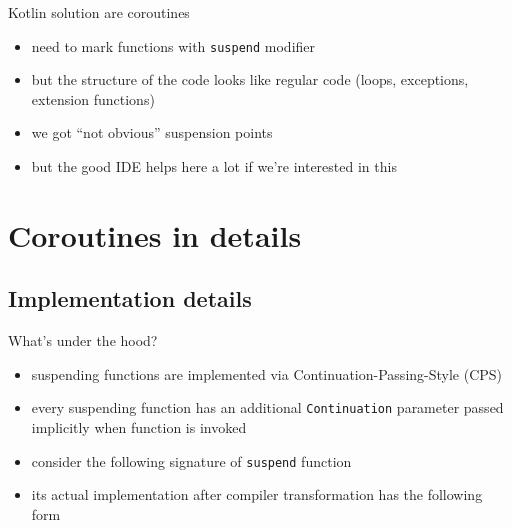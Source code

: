 \documentclass[hyperref={pdfpagelabels=false},xcolor={dvipsnames},compress,onlytextwidth]{beamer}
\begin{document}
    \begin{frame}[fragile]{Kotlin solution are coroutines}
        \pause
        \begin{itemize}
            \item need to mark functions with \texttt{suspend} modifier\pause
            \item but the structure of the code looks like regular code (loops, exceptions, extension functions)\pause
            \item we got ``not obvious'' suspension points\pause
            \item but the good IDE helps here a lot if we're interested in this
        \end{itemize}
    \end{frame}


    \section{Coroutines in details}

    \subsection{Implementation details}

    \begin{frame}[fragile]{What's under the hood?}
        \begin{itemize}
            \item suspending functions are implemented via Continuation-Passing-Style (CPS)\pause
            \item every suspending function has an additional \texttt{Continuation} parameter passed implicitly when function is invoked\pause
            \item consider the following signature of \texttt{suspend} function\pause
        \end{itemize}
        \pause
        \begin{itemize}
            \item its actual implementation after compiler transformation has the following form\pause
        \end{itemize}
        
    \end{frame}
\end{document}
